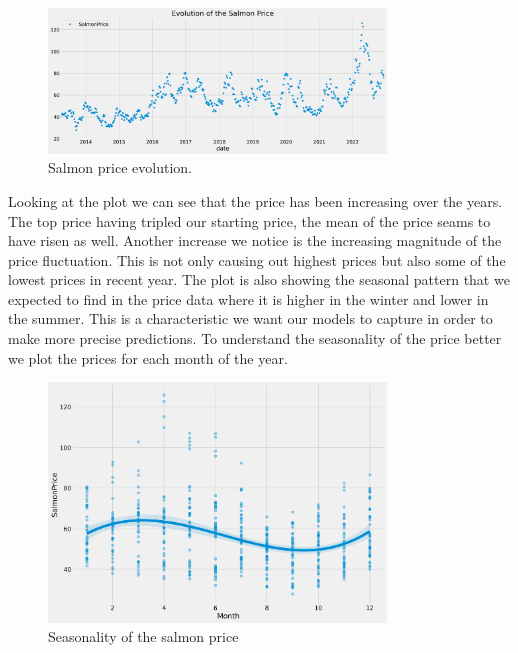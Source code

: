 \begin{figure}[H]
    \centering
    \includegraphics[width=0.8\textwidth]{data/Figures/Descriptive/SalmonPricePlot.png}
    \caption[Evolution of the salmon price]{Salmon price evolution.}\label{fig:Salmon price evolution}
\end{figure}

Looking at the plot we can see that the price has been increasing over the years. The top price having tripled our starting price, the mean of the price seams to have risen as well. Another increase we notice is the increasing magnitude of the price fluctuation. This is not only causing out highest prices but also some of the lowest prices in recent year. The plot is also showing the seasonal pattern that we expected to find in the price data where it is higher in the winter and lower in the summer. This is a characteristic we want our models to capture in order to make more precise predictions. To understand the seasonality of the price better we plot the prices for each month of the year.

\begin{figure}[H]
    \centering
    \includegraphics[width=0.8\textwidth]{data/Figures/Descriptive/seasonality.png}
    \caption[Seasonality of the salmon price]{Seasonality of the salmon price}\label{fig:Seasonality of the salmon price}
\end{figure}

